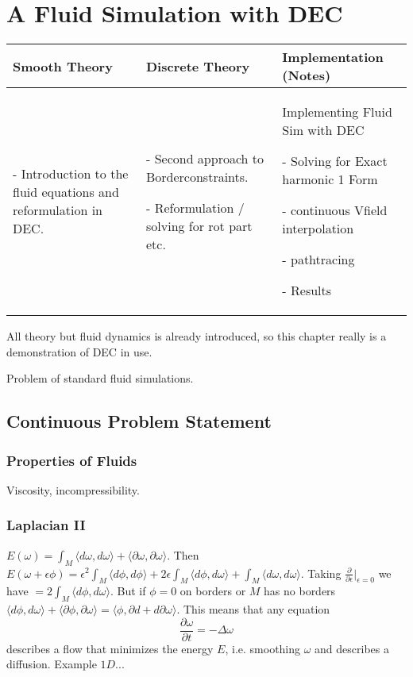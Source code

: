 \chapter{A Fluid Simulation with DEC}
\begin{longtable}{|p{4.5cm}|p{4.5cm}|p{4.5cm}|}
	\hline
	Smooth Theory& Discrete Theory& Implementation (Notes)\\
	\hline
		\begin{packed_enum}
			\item[-] Introduction to the fluid equations and reformulation in DEC.
		\end{packed_enum}
		&
		\begin{packed_enum}
			\item[-] Second approach to Borderconstraints.
			\item[-] Reformulation / solving for rot part etc.
		\end{packed_enum}
		 & 
		 Implementing Fluid Sim with DEC
		 \begin{packed_enum}
			\item[-] Solving for Exact harmonic 1 Form
			\item[-] continuous Vfield interpolation
			\item[-] pathtracing
			\item[-] Results
		\end{packed_enum}
		 \\		
	\hline
\end{longtable}
All theory but fluid dynamics is already introduced, so this chapter really is a demonstration of DEC in use. 

Problem of standard fluid simulations.

\section{Continuous Problem Statement}
\subsection{Properties of Fluids}
Viscosity, incompressibility.

\subsection{Laplacian II}
$E(\omega) = \int_M \langle d\omega, d\omega \rangle + \langle \partial\omega, \partial\omega \rangle$. Then $E(\omega + \epsilon\phi) = \epsilon^2\int_M \langle d\phi, d\phi \rangle + 2\epsilon\int_M \langle d\phi, d\omega \rangle + \int_M \langle d\omega, d\omega \rangle$. Taking $\frac{\partial}{\partial \epsilon} |_{\epsilon = 0}$ we have $=2\int_M \langle d\phi, d\omega \rangle$. But if $\phi = 0$ on borders or $M$ has no borders $\langle d\phi, d\omega \rangle + \langle \partial\phi, \partial\omega \rangle= \langle \phi, \partial d + d \partial\omega \rangle$. This means that any equation 
\[\frac{\partial \omega}{ \partial t} = - \Delta \omega \]
describes a flow that minimizes the energy $E$, i.e. smoothing $\omega$ and describes a diffusion. Example $1D$...
	
